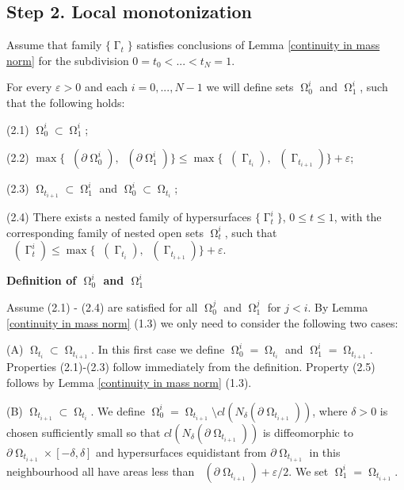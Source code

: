 \documentclass[12pt]{amsart}
\DeclareMathOperator{\Hn}{\mathcal{H}^n}
\DeclareMathOperator{\G}{\Gamma}
\DeclareMathOperator{\Om}{\Omega}
\theoremstyle{definition}
\begin{document}
\subsection{Step 2. Local monotonization} 
Assume that family $\{\G_t\}$ satisfies
conclusions of Lemma \ref*{continuity in mass norm}
for the subdivision $0=t_0< ... < t_N=1$.

For every $\varepsilon>0$ and each $i=0,...,N-1$ we will define sets
$\Om^i_0$ and $\Om^i_1$,
such that the following holds:

(2.1) $\Om^i_0 \subset \Om^i_1$;

(2.2) $\max \{ \Hn( \partial \Om^i_0), 
\Hn(\partial \Om^i_1) \} 
    \leq \max \{ \Hn(\G_{t_i}), \Hn(\G_{t_{i+1}})\} + \varepsilon$;

(2.3) $\Om_{t_{i+1}} \subset \Om^i_1$ and
$  \Om^i_0 \subset \Om_{t_{i}}$;
        

(2.4) There exists a nested family of hypersurfaces
$\{\G^i_t\}$, $0 \leq t \leq 1$,
with the corresponding 
family of nested open sets
$\Om^i_t$, such that
$\Hn(\G^i_t) \leq \max \{ \Hn(\G_{t_i}), \Hn(\G_{t_{i+1}})\} + \varepsilon$.



\textbf{Definition of $\Om^i_0$ and $\Om^i_1$}

Assume (2.1) - (2.4) are satisfied for all $\Om^j_0$ and $\Om^j_1$ for
$j<i$.
By Lemma \ref*{continuity in mass norm} (1.3)
we only need to consider the following two cases:

(A) $\Om_{t_{i}} \subset \Om_{t_{i+1}}$. In this first case we define $\Om^i_0 = \Om_{t_{i}}$
and $\Om^i_1 = \Om_{t_{i+1}}$. Properties (2.1)-(2.3) follow
immediately from the definition. 
Property (2.5) follows by Lemma \ref*{continuity in mass norm} (1.3).

(B) $\Om_{t_{i+1}} \subset \Om_{t_{i}}$. 
We define $\Om^i_0 = \Om_{t_{i+1}} \setminus cl(N_{\delta}( \partial \Om_{t_{i+1}}))$,
where $\delta>0$ is chosen sufficiently small so that $cl(N_{\delta}( \partial \Om_{t_{i+1}}))$
is diffeomorphic to $\partial \Om_{t_{i+1}} \times [-\delta, \delta]$ and hypersurfaces
equidistant from $\partial \Om_{t_{i+1}}$ in this neighbourhood all have areas
less than $\Hn (\partial \Om_{t_{i+1}}) + \varepsilon/2$. We set $\Om^i_1 = \Om_{t_{i+1}}$.
\end{document}
